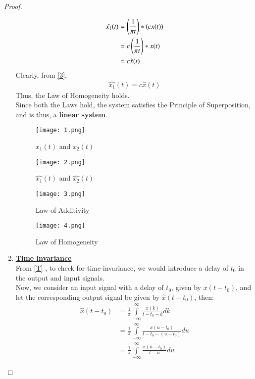 \documentclass[journal,12pt,twocolumn]{IEEEtran}
\begin{document}
\begin{proof}
\begin{enumerate}
\begin{align}
    \hat{x_1}(t) &= \left(\frac{1}{\pi t}\right)\ast (cx(t))\\
    &= c\left(\frac{1}{\pi t}\right)\ast x(t)\\
     &= c\hat{x}(t)
     \label{3}
\end{align}
Clearly, from \eqref{3},
\begin{align}
    \hat{x_1}(t) = c\hat{x}(t)
\end{align}
Thus, the Law of Homogeneity holds.\\
Since both the Laws hold, the system satisfies the Principle of Superposition, and is thus, a \textbf{linear system}.

 \begin{figure}[!htp]
\centering
 \texttt{[image: 1.png]}
 \caption{$x_1(t)$ and $x_2(t)$}
 \end{figure}
 
  \begin{figure}[!htp]
\centering
 \texttt{[image: 2.png]}
 \caption{$\hat{x_1}(t)$ and $\hat{x_2}(t)$}
 \label{fig2}
 \end{figure}
 
  \begin{figure}[!htp]
\centering
 \texttt{[image: 3.png]}
 \caption{Law of Additivity}
 \end{figure}
 
  \begin{figure}[!htp]
\centering
 \texttt{[image: 4.png]}
 \caption{Law of Homogeneity}
 \end{figure}


\item \textbf{\underline{Time invariance}}\\
From \eqref{T} , to check for time-invariance, we would introduce a delay of $t_0$ in the output and input signals.\\
Now, we consider an input signal with a delay of $t_0$, given by $x(t-t_0)$, and let the corresponding output signal be given by $\hat{x}(t-t_0)$, then:
\begin{align}
    \hat{x}(t-t_0) &= \frac{1}{\pi}\int\limits_{-\infty}^{\infty}\frac{x(k)}{t-t_0-k} dk\label{4}\\
    &= \frac{1}{\pi}\int\limits_{-\infty}^{\infty}\frac{x(u-t_0)}{t-t_0-(u-t_0)} du\\
    &= \frac{1}{\pi}\int\limits_{-\infty}^{\infty}\frac{x(u-t_0)}{t-u} du\label{01}
\end{align}


\end{enumerate}
\end{proof}
\end{document}
